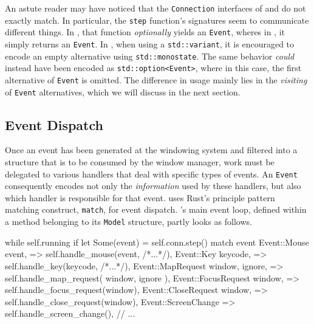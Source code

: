 
An  astute  reader may  have  noticed  that the  \texttt{Connection}  interfaces
of   \wmrs   and   \wmcpp   do   not   exactly   match.   In   particular,   the
\texttt{step}  function's  signatures  seem  to  communicate  different  things.
In   \wmrs,  that   function  \textit{optionally}   yields  an   \texttt{Event},
wheres  in  \wmcpp,   it  simply  returns  an  \texttt{Event}.   In  \cpp,  when
using   a   \texttt{std::variant},   it   is   encouraged   to   encode
an   empty   alternative  using   \texttt{std::monostate}\cite{cppstd}.
The   same    behavior   \textit{could}    instead   have   been    encoded   as
\texttt{std::option<Event>}, where in this  case, the first alternative
of  \texttt{Event} is  omitted.  The  difference in  usage  mainly  lies in  the
\textit{visiting} of \texttt{Event}  alternatives, which we will  discuss in the
next section.

\subsection{Event Dispatch}

Once an  event has been  generated at the windowing  system and filtered  into a
structure  that  is  to  be  consumed  by  the  window  manager,  work  must  be
delegated  to various  handlers  that deal  with specific  types  of events.  An
\texttt{Event} consequently  encodes not  only the \textit{information}  used by
these handlers, but also which handler is responsible for that event. \wmrs uses
Rust's principle pattern matching construct, \texttt{match}, for event
dispatch. \wmrs's  main event  loop, defined  within a  method belonging  to its
\texttt{Model} structure, partly looks as follows.

\begin{rustblock}
  while self.running {
    if let Some(event) = self.conn.step() {
      match event {
        Event::Mouse { event, }
          => self.handle_mouse(event, /*...*/),
        Event::Key { keycode, }
          => self.handle_key(keycode, /*...*/),
        Event::MapRequest { window, ignore, }
          => self.handle_map_request(
            window, ignore
          ),
        Event::FocusRequest { window, }
          => self.handle_focus_request(window),
        Event::CloseRequest { window, }
          => self.handle_close_request(window),
        Event::ScreenChange
          => self.handle_screen_change(),
        // ...
      }
    }
  }
\end{rustblock}

